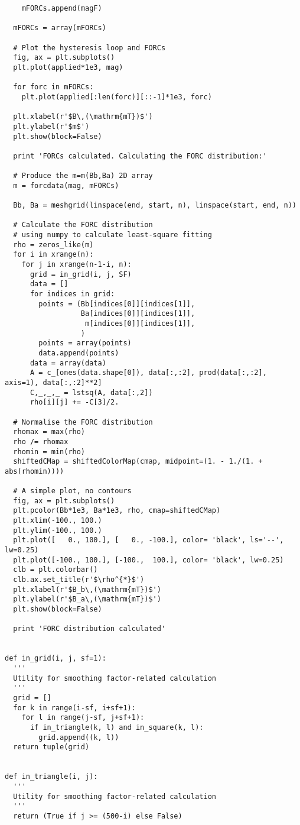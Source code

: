 \begin{lstlisting}
    mFORCs.append(magF)

  mFORCs = array(mFORCs)

  # Plot the hysteresis loop and FORCs
  fig, ax = plt.subplots()
  plt.plot(applied*1e3, mag)

  for forc in mFORCs:
    plt.plot(applied[:len(forc)][::-1]*1e3, forc)

  plt.xlabel(r'$B\,(\mathrm{mT})$')
  plt.ylabel(r'$m$')
  plt.show(block=False)

  print 'FORCs calculated. Calculating the FORC distribution:'

  # Produce the m=m(Bb,Ba) 2D array
  m = forcdata(mag, mFORCs)

  Bb, Ba = meshgrid(linspace(end, start, n), linspace(start, end, n))

  # Calculate the FORC distribution
  # using numpy to calculate least-square fitting
  rho = zeros_like(m)
  for i in xrange(n):
    for j in xrange(n-1-i, n):
      grid = in_grid(i, j, SF)
      data = []
      for indices in grid:
        points = (Bb[indices[0]][indices[1]],
                  Ba[indices[0]][indices[1]],
                   m[indices[0]][indices[1]],
                  )
        points = array(points)
        data.append(points)
      data = array(data)
      A = c_[ones(data.shape[0]), data[:,:2], prod(data[:,:2], axis=1), data[:,:2]**2]
      C,_,_,_ = lstsq(A, data[:,2])
      rho[i][j] += -C[3]/2.

  # Normalise the FORC distribution
  rhomax = max(rho)
  rho /= rhomax
  rhomin = min(rho)
  shiftedCMap = shiftedColorMap(cmap, midpoint=(1. - 1./(1. + abs(rhomin))))

  # A simple plot, no contours
  fig, ax = plt.subplots()
  plt.pcolor(Bb*1e3, Ba*1e3, rho, cmap=shiftedCMap)
  plt.xlim(-100., 100.)
  plt.ylim(-100., 100.)
  plt.plot([   0., 100.], [   0., -100.], color= 'black', ls='--', lw=0.25)
  plt.plot([-100., 100.], [-100.,  100.], color= 'black', lw=0.25)
  clb = plt.colorbar()
  clb.ax.set_title(r'$\rho^{*}$')
  plt.xlabel(r'$B_b\,(\mathrm{mT})$')
  plt.ylabel(r'$B_a\,(\mathrm{mT})$')
  plt.show(block=False)

  print 'FORC distribution calculated'


def in_grid(i, j, sf=1):
  '''
  Utility for smoothing factor-related calculation
  '''
  grid = []
  for k in range(i-sf, i+sf+1):
    for l in range(j-sf, j+sf+1):
      if in_triangle(k, l) and in_square(k, l):
        grid.append((k, l))
  return tuple(grid)


def in_triangle(i, j):
  '''
  Utility for smoothing factor-related calculation
  '''
  return (True if j >= (500-i) else False)



\end{lstlisting}
